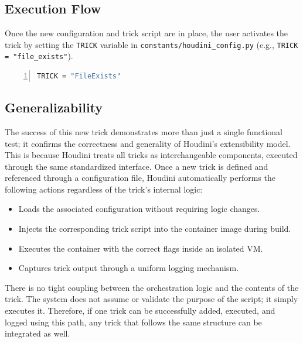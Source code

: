 \begin{doublespace}
\subsection*{Execution Flow}

Once the new configuration and trick script are in place, the user activates the trick by setting the \texttt{TRICK} variable in \texttt{constants/houdini\_config.py} (e.g., \texttt{TRICK = "file\_exists"}). 

\begin{lstlisting}[language=bash, caption={Trick Configuration Parameters}, label={lst:escape-trick}, numbers=left, numberstyle=\tiny, stepnumber=1, frame=single, breaklines=true, backgroundcolor=\color{gray!10}, basicstyle=\ttfamily\footnotesize, showspaces=false, showstringspaces=false]
TRICK = "FileExists"
\end{lstlisting}

\subsection*{Generalizability}

The success of this new trick demonstrates more than just a single functional test; it confirms the correctness and generality of Houdini’s extensibility model. This is because Houdini treats all tricks as interchangeable components, executed through the same standardized interface. Once a new trick is defined and referenced through a configuration file, Houdini automatically performs the following actions regardless of the trick’s internal logic:

\begin{itemize}
\item Loads the associated configuration without requiring logic changes.
\item Injects the corresponding trick script into the container image during build.
\item Executes the container with the correct flags inside an isolated VM.
\item Captures trick output through a uniform logging mechanism.
\end{itemize}

There is no tight coupling between the orchestration logic and the contents of the trick. The system does not assume or validate the purpose of the script; it simply executes it. Therefore, if one trick can be successfully added, executed, and logged using this path, any trick that follows the same structure can be integrated as well.


\end{doublespace}
